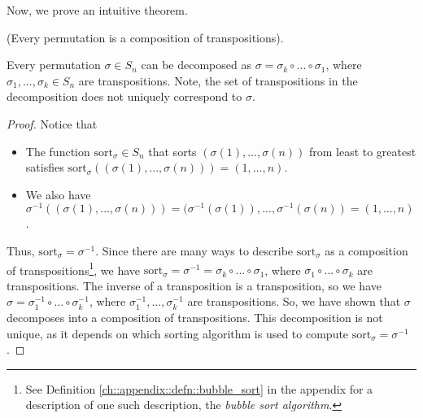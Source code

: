 Now, we prove an intuitive theorem.

\begin{theorem}
\label{ch::lin_alg::thm::permutations_decomposition_into_transpositions}
    (Every permutation is a composition of transpositions).

    Every permutation $\sigma \in S_n$ can be decomposed as $\sigma = \sigma_k \circ ... \circ \sigma_1$, where $\sigma_1, ..., \sigma_k \in S_n$ are transpositions. Note, the set of transpositions in the decomposition does not uniquely correspond to $\sigma$.
\end{theorem}

\begin{proof}  
    Notice that
    
    \begin{itemize}
        \item The function $\text{sort}_\sigma \in S_n$ that sorts $(\sigma(1), ..., \sigma(n))$ from least to greatest satisfies $\text{sort}_\sigma((\sigma(1), ..., \sigma(n))) = (1, ..., n)$.
        \item We also have $\sigma^{-1}((\sigma(1), ..., \sigma(n))) = (\sigma^{-1}(\sigma(1)), ..., \sigma^{-1}(\sigma(n)) = (1, ..., n)$.
    \end{itemize} 
    
    Thus, $\text{sort}_\sigma = \sigma^{-1}$. Since there are many ways to describe $\text{sort}_\sigma$ as a composition of transpositions\footnote{See Definition \ref{ch::appendix::defn::bubble_sort} in the appendix for a description of one such description, the \textit{bubble sort algorithm}.}, we have $\text{sort}_\sigma = \sigma^{-1} = \sigma_k \circ ... \circ \sigma_1$, where $\sigma_1 \circ ... \circ \sigma_k$ are transpositions. The inverse of a transposition is a transposition, so we have $\sigma = \sigma_1^{-1} \circ ... \circ \sigma_k^{-1}$, where $\sigma_1^{-1}, ..., \sigma_k^{-1}$ are transpositions. So, we have shown that $\sigma$ decomposes into a composition of transpositions. This decomposition is not unique, as it depends on which sorting algorithm is used to compute $\text{sort}_\sigma = \sigma^{-1}$.
    
\end{proof}

